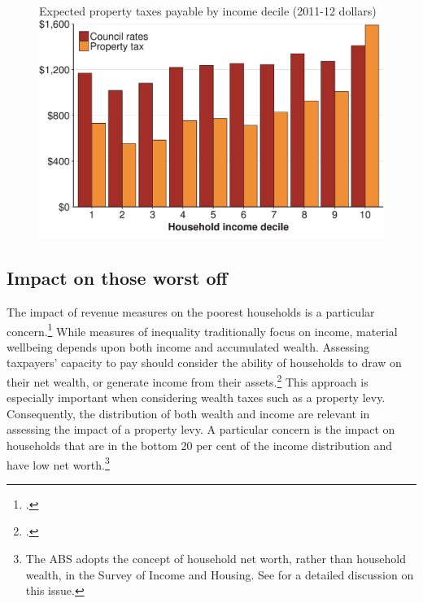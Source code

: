 \documentclass[twoside,english]{grattanBudgetRepairb5portrait}
\begin{document}
\begin{figure}
%
{Expected property taxes payable by income decile (2011-12 dollars)}
\includegraphics[width=\columnwidth]{Property-taxes/atlas/figure/Figure10-1.pdf}

\end{figure}

\subsection{Impact on those worst off}
The impact of revenue measures on the poorest households is a particular concern.\footcite[][21]{DaleyMcGannonSavageEtAl2013BalancingBudgets}  While measures of inequality traditionally focus on income, material wellbeing depends upon both income and accumulated wealth. Assessing taxpayers’ capacity to pay should consider the ability of households to draw on their net wealth, or generate income from their assets.\footcite[][180]{OECD2013d}  This approach is especially important when considering wealth taxes such as a property levy. Consequently, the distribution of both wealth and income are relevant in assessing the impact of a property levy. A particular concern is the impact on households that are in the bottom 20 per cent of the income distribution and have low net worth.\footnote{The ABS adopts the concept of household net worth, rather than household wealth, in the Survey of Income and Housing. See \textcite[][19]{ABS2014l} for a detailed discussion on this issue.} 
\end{document}
